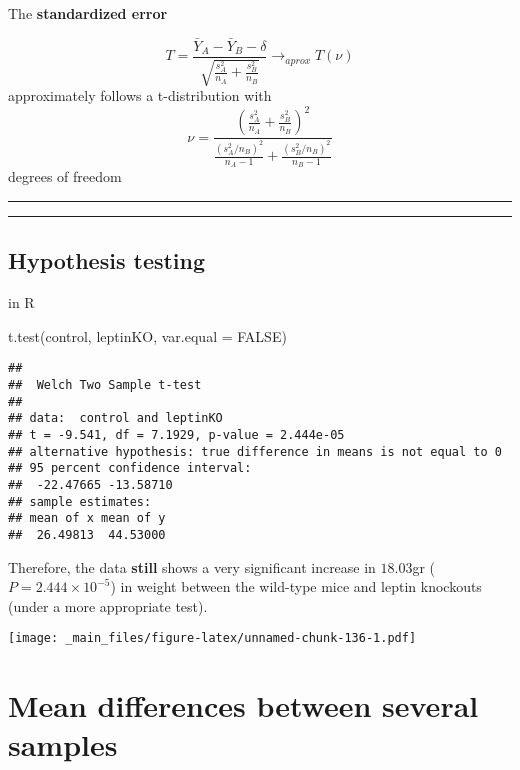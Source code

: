 \documentclass[
]{book}
\newenvironment{Shaded}{\begin{snugshade}}{\end{snugshade}}
\newcommand{\AttributeTok}[1]{\textcolor[rgb]{0.77,0.63,0.00}{#1}}
\newcommand{\ConstantTok}[1]{\textcolor[rgb]{0.00,0.00,0.00}{#1}}
\newcommand{\FunctionTok}[1]{\textcolor[rgb]{0.00,0.00,0.00}{#1}}
\newcommand{\NormalTok}[1]{#1}
\begin{document}
The \textbf{standardized error}

\[T=\frac{\bar{Y}_A-\bar{Y}_B -\delta}{\sqrt{\frac{s_A^2}{n_A}+\frac{s_B^2}{n_B}}} \rightarrow_{aprox} T(\nu)\]
approximately follows a t-distribution with
\[\nu=\frac{(\frac{s_A^2}{n_A}+\frac{s_B^2}{n_B})^2}{\frac{(s_A^2/n_B)^2}{n_A-1}+\frac{(s_B^2/n_B)^2}{n_B-1}}\]
degrees of freedom

\begin{center}\rule{0.5\linewidth}{0.5pt}\end{center}

\begin{center}\rule{0.5\linewidth}{0.5pt}\end{center}

\hypertarget{hypothesis-testing-5}{%
\section{Hypothesis testing}\label{hypothesis-testing-5}}

in R

\begin{Shaded}
\begin{Highlighting}[]
\FunctionTok{t.test}\NormalTok{(control, leptinKO, }\AttributeTok{var.equal =} \ConstantTok{FALSE}\NormalTok{)}
\end{Highlighting}
\end{Shaded}

\begin{verbatim}
## 
##  Welch Two Sample t-test
## 
## data:  control and leptinKO
## t = -9.541, df = 7.1929, p-value = 2.444e-05
## alternative hypothesis: true difference in means is not equal to 0
## 95 percent confidence interval:
##  -22.47665 -13.58710
## sample estimates:
## mean of x mean of y 
##  26.49813  44.53000
\end{verbatim}

Therefore, the data \textbf{still} shows a very significant increase in \(18.03\)gr (\(P=2.444 \times 10^{-5}\)) in weight between the wild-type mice and leptin knockouts (under a more appropriate test).

\texttt{[image: \_main\_files/figure-latex/unnamed-chunk-136-1.pdf]}

\hypertarget{mean-differences-between-several-samples}{%
\chapter{Mean differences between several samples}\label{mean-differences-between-several-samples}}
\end{document}
